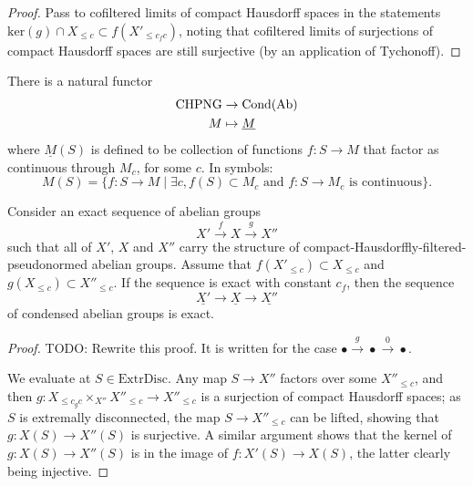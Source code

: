 \begin{proof}
  Pass to cofiltered limits of compact Hausdorff spaces in the statements $\mathrm{ker}(g)\cap X_{\leq c}\subset f(X'_{\leq c_fc})$,
  noting that cofiltered limits of surjections of compact Hausdorff spaces are still surjective (by an application of Tychonoff).
\end{proof}

\begin{definition}
  \label{CHPNG-to-Cond}
  \leanok
  There is a natural functor
  \begin{align*}
    \text{CHPNG} &\to \operatorname{Cond}(\operatorname{Ab}) \\
    M &\mapsto \underline{M}
  \end{align*}
  where $\underline{M}(S)$ is defined to be collection of functions $f \colon S \to M$ that factor as continuous through $M_c$, for some $c$.
  In symbols:
  \[ M(S) = \{f \colon S \to M \mid \exists c, f(S) \subset M_c \text{ and $f \colon S \to M_c$ is continuous}\}. \]
\end{definition}

\begin{proposition}
  \label{CHPNG-Cond-exact}
  \leanok
  Consider an exact sequence of abelian groups
  \[ X'\xrightarrow{f} X\xrightarrow{g} X'' \]
  such that all of $X'$, $X$ and $X''$ carry the structure of compact-Hausdorffly-filtered-pseudonormed abelian groups.
  Assume that $f(X'_{\leq c})\subset X_{\leq c}$ and $g(X_{\leq c})\subset X''_{\leq c}$.
  If the sequence is exact with constant $c_f$,
  then the sequence
  \[ \underline{X'}\to \underline{X}\to \underline{X''} \]
  of condensed abelian groups is exact.
\end{proposition}

\begin{proof}
  \leanok
  TODO: Rewrite this proof. It is written for the case $\bullet \stackrel{g}{\to} \bullet \stackrel{0}{\to} \bullet$.

  We evaluate at $S\in \mathrm{ExtrDisc}$.
  Any map $S\to X''$ factors over some $X''_{\leq c}$,
  and then $g: X_{\leq c_gc}\times_{X''} X''_{\leq c}\to X''_{\leq c}$ is a surjection of compact Hausdorff spaces;
  as $S$ is extremally disconnected, the map $S\to X''_{\leq c}$ can be lifted,
  showing that $g: X(S)\to X''(S)$ is surjective.
  A similar argument shows that the kernel of $g: X(S)\to X''(S)$ is in the image of $f: X'(S)\to X(S)$,
  the latter clearly being injective.
\end{proof}

